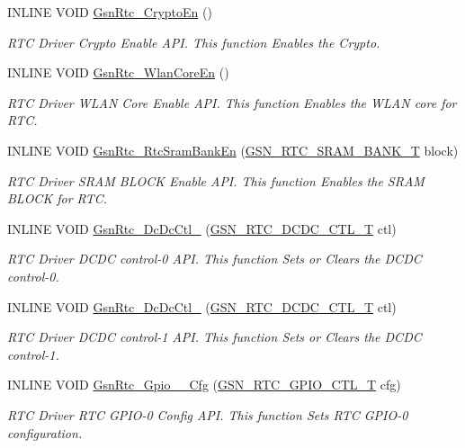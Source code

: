 \begin{DoxyCompactItemize}
INLINE VOID \hyperlink{a00651_ga41ce100b896cbdf73f0a874d673a2c52}{GsnRtc\_\-CryptoEn} ()
\begin{DoxyCompactList}\small\item\em RTC Driver Crypto Enable API. This function Enables the Crypto. \end{DoxyCompactList}\item 
INLINE VOID \hyperlink{a00651_ga84346acd50525b7a6a298aa42f727d05}{GsnRtc\_\-WlanCoreEn} ()
\begin{DoxyCompactList}\small\item\em RTC Driver WLAN Core Enable API. This function Enables the WLAN core for RTC. \end{DoxyCompactList}\item 
INLINE VOID \hyperlink{a00651_ga82230ca9245f726272600fd645e0b544}{GsnRtc\_\-RtcSramBankEn} (\hyperlink{a00651_ga70bc76d00099ffb3dabb49354ff57870}{GSN\_\-RTC\_\-SRAM\_\-BANK\_\-T} block)
\begin{DoxyCompactList}\small\item\em RTC Driver SRAM BLOCK Enable API. This function Enables the SRAM BLOCK for RTC. \end{DoxyCompactList}\item 
INLINE VOID \hyperlink{a00651_ga2a5f3b06d3e70d254d4b9044b87c8006}{GsnRtc\_\-DcDcCtl\_} (\hyperlink{a00651_gadac67c4bef428c38b07db46ce0a24d23}{GSN\_\-RTC\_\-DCDC\_\-CTL\_\-T} ctl)
\begin{DoxyCompactList}\small\item\em RTC Driver DCDC control-\/0 API. This function Sets or Clears the DCDC control-\/0. \end{DoxyCompactList}\item 
INLINE VOID \hyperlink{a00651_ga139c57e6eaeffd048de0c51ccee20b64}{GsnRtc\_\-DcDcCtl\_} (\hyperlink{a00651_gadac67c4bef428c38b07db46ce0a24d23}{GSN\_\-RTC\_\-DCDC\_\-CTL\_\-T} ctl)
\begin{DoxyCompactList}\small\item\em RTC Driver DCDC control-\/1 API. This function Sets or Clears the DCDC control-\/1. \end{DoxyCompactList}\item 
INLINE VOID \hyperlink{a00651_gac9cef74b21e7fdac330f246e7ff778fb}{GsnRtc\_\-Gpio\_\_\-Cfg} (\hyperlink{a00651_gaac2b2cc7a6f64a96caddc19f3b3df78b}{GSN\_\-RTC\_\-GPIO\_\-CTL\_\-T} cfg)
\begin{DoxyCompactList}\small\item\em RTC Driver RTC GPIO-\/0 Config API. This function Sets RTC GPIO-\/0 configuration. \end{DoxyCompactList}\item 

\end{DoxyCompactItemize}
